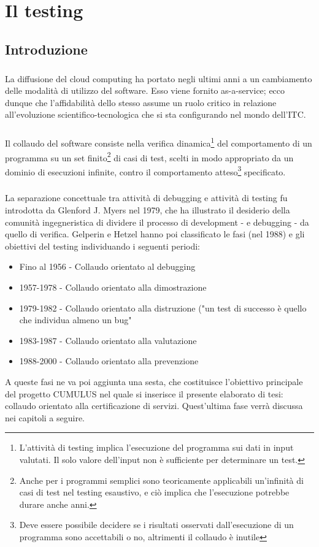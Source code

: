 \chapter{Il testing}
\section{Introduzione}
\paragraph{}La diffusione del cloud computing ha portato negli ultimi anni a un cambiamento delle modalità di utilizzo del software. Esso viene fornito as-a-service; ecco dunque che l'affidabilità dello stesso assume un ruolo critico in relazione all'evoluzione scientifico-tecnologica che si sta configurando nel mondo dell'ITC.\newline
\paragraph{}
Il collaudo del software consiste nella verifica dinamica\footnote{L'attività di testing implica l'esecuzione del programma sui dati in input valutati. Il solo valore dell'input non è sufficiente per determinare un test.} del comportamento di un programma su un set finito\footnote{Anche per i programmi semplici sono teoricamente applicabili un'infinità di casi di test nel testing esaustivo, e ciò implica che l'esecuzione potrebbe durare anche anni.} di casi di test, scelti in modo appropriato da un dominio di esecuzioni infinite, contro il comportamento atteso\footnote{Deve essere possibile decidere se i risultati osservati dall'esecuzione di un programma sono accettabili o no, altrimenti il collaudo è inutile} specificato.\cite{AntoniaBertolino03}
\paragraph{}
La separazione concettuale tra attività di debugging e attività di testing fu introdotta da Glenford J. Myers nel 1979\cite{ArtOfSwTesting}, che ha illustrato il desiderio della comunità ingegneristica di dividere il processo di development - e debugging - da quello di verifica.
Gelperin e Hetzel\cite{GrowthOfSwTesting} hanno poi classificato le fasi (nel 1988) e gli obiettivi del testing individuando i seguenti periodi:
\begin{itemize}
\item Fino al 1956 - Collaudo orientato al debugging
\item 1957-1978 - Collaudo orientato alla dimostrazione
\item 1979-1982 - Collaudo orientato alla distruzione ("un test di successo è quello che individua almeno un bug" \cite{ArtOfSwTesting}
\item 1983-1987 - Collaudo orientato alla valutazione
\item 1988-2000 - Collaudo orientato alla prevenzione
\end{itemize}
A queste fasi ne va poi aggiunta una sesta, che costituisce l'obiettivo principale del progetto CUMULUS nel quale si inserisce il presente elaborato di tesi: collaudo orientato alla certificazione di servizi.
Quest'ultima fase verrà discussa nei capitoli a seguire.
